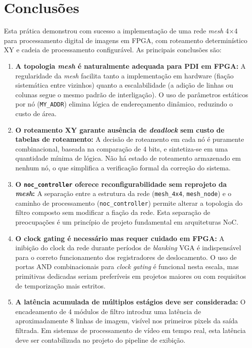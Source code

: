 \documentclass[12pt, a4paper]{article}
\begin{document}
	\section{Conclusões}
	
	Esta prática demonstrou com sucesso a implementação de uma rede
	\textit{mesh} 4$\times$4 para processamento digital de imagens em FPGA,
	com roteamento determinístico XY e cadeia de processamento configurável.
	As principais conclusões são:
	
	\begin{enumerate}
		\item \textbf{A topologia \textit{mesh} é naturalmente adequada para PDI
			em FPGA:} A regularidade da \textit{mesh} facilita tanto a implementação
		em hardware (fiação sistemática entre vizinhos) quanto a escalabilidade
		(a adição de linhas ou colunas segue o mesmo padrão de interligação). O
		uso de parâmetros estáticos por nó (\texttt{MY\_ADDR}) elimina lógica
		de endereçamento dinâmico, reduzindo o custo de área.
		
		\item \textbf{O roteamento XY garante ausência de \textit{deadlock} sem
			custo de tabelas de roteamento:} A decisão de roteamento em cada nó
		é puramente combinacional, baseada na comparação de 4 bits, e sintetiza-se
		em uma quantidade mínima de lógica. Não há estado de roteamento armazenado
		em nenhum nó, o que simplifica a verificação formal da correção do sistema.
		
		\item \textbf{O \texttt{noc\_controller} oferece reconfigurabilidade sem
			reprojeto da \textit{mesh}:} A separação entre a estrutura da rede
		(\texttt{mesh\_4x4}, \texttt{mesh\_node}) e o caminho de processamento
		(\texttt{noc\_controller}) permite alterar a topologia do filtro composto
		sem modificar a fiação da rede. Esta separação de preocupações é um
		princípio de projeto fundamental em arquiteturas NoC.
		
		\item \textbf{O clock gating é necessário mas requer cuidado em FPGA:}
		A inibição do clock da rede durante períodos de \textit{blanking} VGA
		é indispensável para o correto funcionamento dos registradores de
		deslocamento. O uso de portas AND combinacionais para \textit{clock gating}
		é funcional nesta escala, mas primitivas dedicadas seriam preferíveis em
		projetos maiores ou com requisitos de temporização mais estritos.
		
		\item \textbf{A latência acumulada de múltiplos estágios deve ser considerada:}
		O encadeamento de 4 módulos de filtro introduz uma latência de
		aproximadamente 8 linhas de imagem, visível nos primeiros pixels da
		saída filtrada. Em sistemas de processamento de vídeo em tempo real, esta
		latência deve ser contabilizada no projeto do pipeline de exibição.
	\end{enumerate}
	
\end{document}
